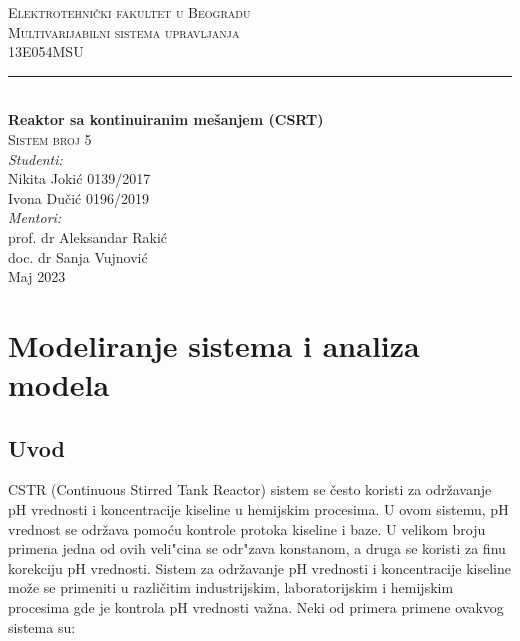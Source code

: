 \documentclass[a4paper,11pt]{article}
\theoremstyle{definition} \newtheorem{deff}{Definicija}[section]
\theoremstyle{definition} \newtheorem{prim}[deff]{Primer}
\theoremstyle{plain} \newtheorem{teor}[deff]{Teorema}
\begin{document}
	
	\begin{titlepage}
		
		\newcommand{\HRule}{\rule{\linewidth}{0.5mm}} 							%
		\center 
		
		\textsc{\LARGE Elektrotehnički fakultet u Beogradu}\\[1cm]
		
		\textsc{\Large Multivarijabilni sistema upravljanja}\\[0.2cm]
		\textsc{\large 13E054MSU}\\[1cm] 										
		\HRule \\[0.8cm]
		{ \huge \bfseries Reaktor sa kontinuiranim mešanjem (CSRT)}\\[0.7cm]								%
		\textsc{\large Sistem broj 5}\\[1cm]
		
		
		\large
		\vfill 
		\emph{Studenti:}\\
		Nikita Jokić 0139/2017\\[0.1cm]
		Ivona Dučić 0196/2019\\[1.5cm]		
		\emph{Mentori:}\\
		prof. dr Aleksandar Rakić\\[0.1cm]
		doc. dr Sanja Vujnović\\[1.5cm]										
		{\large Maj 2023}\\[2cm]
	\end{titlepage}
	\tableofcontents
	\newpage
	
	\section{Modeliranje sistema i analiza modela}
	\subsection{Uvod} 
	
	CSTR (Continuous Stirred Tank Reactor) sistem se često koristi za održavanje pH vrednosti i koncentracije kiseline u hemijskim procesima. U ovom sistemu, pH vrednost se održava pomoću kontrole protoka kiseline i baze. U velikom broju primena jedna od ovih veli"cina se odr"zava konstanom, a druga se koristi za finu korekciju pH vrednosti. Sistem za održavanje pH vrednosti i koncentracije kiseline može se primeniti u različitim industrijskim, laboratorijskim i hemijskim procesima gde je kontrola pH vrednosti važna. Neki od primera primene ovakvog sistema su:\\\\
	
\end{document}
